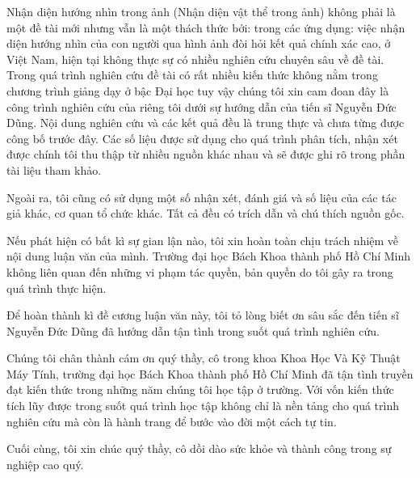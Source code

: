 \documentclass[12pt,a4paper,oneside]{book} %
\begin{document}

\coverpage

\frontmatter


\begin{declaration}
	Nhận diện hướng nhìn trong ảnh (Nhận diện vật thể trong ảnh) không phải là một đề tài mới nhưng vẫn là một thách thức bởi: trong các ứng dụng: việc nhận diện hướng nhìn của con người qua hình ảnh đòi hỏi kết quả chính xác cao, ở Việt Nam, hiện tại không  thực sự có nhiều nghiên cứu chuyên sâu về đề tài. Trong quá trình nghiên cứu đề tài có rất nhiều kiến thức không nằm trong chương trình giảng dạy ở bậc Đại học tuy vậy chúng tôi xin cam đoan đây là công trình nghiên cứu của riêng tôi dưới sự hướng dẫn của tiến sĩ Nguyễn Đức Dũng. Nội dung nghiên cứu và các kết quả đều là trung thực và chưa từng được công bố trước đây. Các số liệu được sử dụng cho quá trình phân tích, nhận xét được chính tôi thu thập từ nhiều nguồn khác nhau và sẽ được ghi rõ trong phần tài liệu tham khảo.
 	
 	Ngoài ra, tôi cũng có sử dụng một số nhận xét, đánh giá và số liệu của các tác giả khác, cơ quan tổ chức khác. Tất cả đều có trích dẫn và chú thích nguồn gốc.
 	
 	Nếu phát hiện có bất kì sự gian lận nào, tôi xin hoàn toàn chịu trách nhiệm về nội dung luận văn của mình. Trường đại học Bách Khoa thành phố Hồ Chí Minh không liên quan đến những vi phạm tác quyền, bản quyền do tôi gây ra trong quá trình thực hiện.

\end{declaration}

\begin{acknowledgments}

	Để hoàn thành kì đề cương luận văn này, tôi tỏ lòng biết ơn sâu sắc đến tiến sĩ Nguyễn Đức Dũng đã hướng dẫn tận tình trong suốt quá trình nghiên cứu.
	
	Chúng tôi chân thành cám ơn quý thầy, cô trong khoa Khoa Học Và Kỹ Thuật Máy Tính, trường đại học Bách Khoa thành phố Hồ Chí Minh đã tận tình truyền đạt kiến thức trong những năm chúng tôi học tập ở trường. Với vốn kiến thức tích lũy được trong suốt quá trình học tập không chỉ là nền tảng cho quá trình nghiên cứu mà còn là hành trang để bước vào đời một cách tự tin.

	Cuối cùng, tôi xin chúc quý thầy, cô dồi dào sức khỏe và thành công trong sự nghiệp cao quý.
	
\end{acknowledgments}
	
\end{document}
